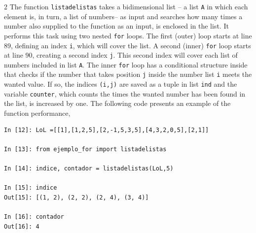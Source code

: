 \begin{paracol}{2}
The function \texttt{listadelistas} takes a bidimensional list -- a list \texttt{A} in which each element is, in turn, a list of numbers-- as input and searches how many times a number also supplied to the function as an input, is enclosed in the list. It performs this task using two nested \texttt{for} loops. The first (outer) loop starts at line $89$, defining an index \texttt{i}, which will cover the list. A second (inner) \texttt{for} loop starts at line $90$, creating a second index \texttt{j}. This second index will cover each list of numbers included in list \texttt{A}. The inner \texttt{for} loop has a conditional structure inside that checks if the number that takes position \texttt{j} inside the number list \texttt{i} meets the wanted value. If so, the indices \texttt{(i,j)} are saved as a tuple in list \texttt{ind} and the variable \texttt{counter}, which counts the times the wanted number has been found in the list, is increased by one. The following code presents an example of the function performance,     
\end{paracol}

\begin{center}
    \begin{minipage}{.7\textwidth}
    \begin{verbatim}    
In [12]: LoL =[[1],[1,2,5],[2,-1,5,3,5],[4,3,2,0,5],[2,1]]

In [13]: from ejemplo_for import listadelistas

In [14]: indice, contador = listadelistas(LoL,5)

In [15]: indice
Out[15]: [(1, 2), (2, 2), (2, 4), (3, 4)]

In [16]: contador
Out[16]: 4
\end{verbatim}
\end{minipage}
\end{center}

